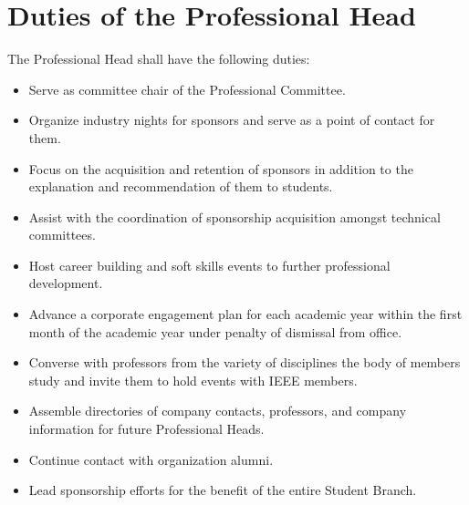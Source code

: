 \documentclass[12pt]{constitution}
\begin{document}
\section{Duties of the Professional Head}
\label{sec:officer_prof}
The Professional Head shall have the following duties:
\begin{itemize}
    \item Serve as committee chair of the Professional Committee.
    \item Organize industry nights for sponsors and serve as a point of contact for them.
    \item Focus on the acquisition and retention of sponsors in addition to the explanation and recommendation of them to students.
    \item Assist with the coordination of sponsorship acquisition amongst technical committees. 
    \item Host career building and soft skills events to further professional development.
    \item Advance a corporate engagement plan for each academic year within the first month of the academic year under penalty of dismissal from office.
    \item Converse with professors from the variety of disciplines the body of members study and invite them to hold events with IEEE members.
    \item Assemble directories of company contacts, professors, and company information for future Professional Heads.
    \item Continue contact with organization alumni.
	\item Lead sponsorship efforts for the benefit of the entire Student Branch.
\end{itemize}
\end{document}
